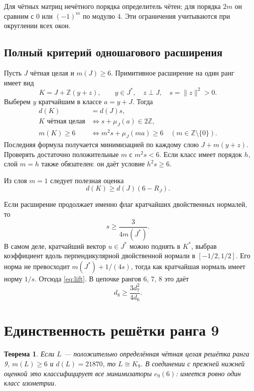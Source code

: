 \documentclass[11pt,a4paper]{article}
\newtheorem{theorem}{Теорема}[section]
\theoremstyle{remark}\newtheorem{remark}[theorem]{Замечание}
\newcommand{\Z}{\mathbb Z}\newcommand{\R}{\mathbb R}\newcommand{\F}{\mathbb F}
\begin{document}
Для чётных матриц нечётного порядка определитель чётен; для порядка $2m$ он сравним с $0$ или $(-1)^m$ по модулю 4. Эти ограничения учитываются при округлении всех окон.

\subsection{Полный критерий одношагового расширения}

Пусть $J$ чётная целая и $m(J)\ge6$. Примитивное расширение на один ранг имеет вид
\[
K=J+\Z(y+z),\qquad y\in J^*,\quad z\perp J,\quad s=\|z\|^2>0.
\]
Выберем $y$ кратчайшим в классе $a=y+J$. Тогда
\begin{align}
d(K)&=d(J)s,\label{eq:extensiondet}\\
K\text{ чётная целая}&\Longleftrightarrow s+\mu_J(a)\in2\Z,\label{eq:extensioneven}\\
m(K)\ge6&\Longleftrightarrow
m^2s+\mu_J(ma)\ge6\quad(m\in\Z\setminus\{0\}).\label{eq:extensionmin}
\end{align}
Последняя формула получается минимизацией по каждому слою $J+m(y+z)$. Проверять достаточно положительные $m$ с $m^2s<6$. Если класс имеет порядок $h$, слой $m=h$ также обязателен: он даёт условие $h^2s\ge6$.

Из слоя $m=1$ следует полезная оценка
\begin{equation}\label{eq:gluebound}
d(K)\ge d(J)(6-R_J).
\end{equation}

Если расширение продолжает именно флаг кратчайших двойственных нормалей, то
\begin{equation}\label{eq:lift}
s\ge\frac{3}{4m(J^*)}.
\end{equation}
В самом деле, кратчайший вектор $u\in J^*$ можно поднять в $K^*$, выбрав коэффициент вдоль перпендикулярной двойственной нормали в $[-1/2,1/2]$. Его норма не превосходит $m(J^*)+1/(4s)$, тогда как кратчайшая нормаль имеет норму $1/s$. Отсюда \eqref{eq:lift}. В цепочке рангов 6, 7, 8 это даёт
\begin{equation}\label{eq:lift678}
d_8\ge\frac{3d_7^2}{4d_6}.
\end{equation}

\section{Единственность решётки ранга 9}

\begin{theorem}\label{thm:unique}
Если $L$ --- положительно определённая чётная целая решётка ранга 9, $m(L)\ge6$ и $d(L)=21870$, то $L\cong K_9$. В соединении с прежней нижней оценкой это классифицирует все минимизаторы $e_9(6)$: имеется ровно один класс изометрии.
\end{theorem}
\end{document}
